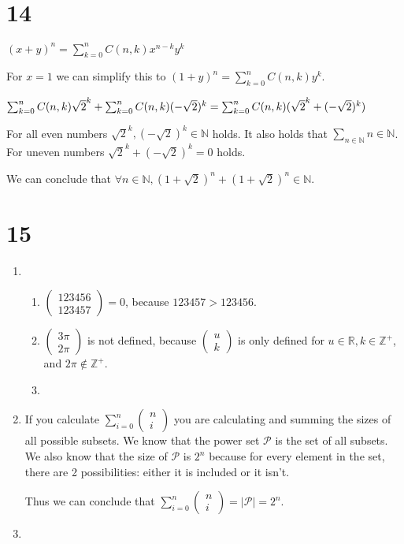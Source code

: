 \documentclass[12pt]{article}
\begin{document}
\section*{14}
$(x + y)^n = \sum_{k = 0}^{n} C(n, k) x^{n - k} y^k$

For $x = 1$ we can simplify this to $(1 + y)^n = \sum_{k = 0}^{n} C(n, k) y^k$.

$\sum_{k = 0}^{n} C(n, k) \sqrt{2}^k + \sum_{k = 0}^{n} C(n, k) (-\sqrt{2})^k\\
=\sum_{k = 0}^{n} C(n, k)(\sqrt{2}^k + (-\sqrt{2})^k)$


For all even numbers $\sqrt{2}^k, (-\sqrt{2})^k \in \mathbb{N}$ holds. It also holds that $\sum_{n \in \mathbb{N}} n \in \mathbb{N}$.\\
For uneven numbers $\sqrt{2}^k + (-\sqrt{2})^k = 0$ holds.

We can conclude that $\forall n \in \mathbb{N}, (1 + \sqrt{2})^n + (1 + \sqrt{2})^n \in \mathbb{N}$.

\section*{15}
\begin{enumerate}[a]
	\item %
	\begin{enumerate}[i]
		\item %
		$\begin{pmatrix}
			123456 \\ 123457
		\end{pmatrix} = 0$, because $123457 > 123456$.
		\item %
		$\begin{pmatrix}
			3 \pi \\ 2 \pi
		\end{pmatrix}$ is not defined, because $\begin{pmatrix}
			u \\ k
		\end{pmatrix}$ is only defined for $u \in \mathbb{R}, k \in \mathbb{Z}^+$, and $2 \pi \not \in \mathbb{Z}^+$.
		\item %
	\end{enumerate}
	\item %
	If you calculate $\sum_{i = 0}^{n} \begin{pmatrix}
		n \\ i
	\end{pmatrix}$ you are calculating and summing the sizes of all possible subsets. We know that the power set $\mathcal{P}$ is the set of all subsets. We also know that the size of $\mathcal{P}$ is $2^n$ because for every element in the set, there are 2 possibilities: either it is included or it isn't.

	Thus we can conclude that $\sum_{i = 0}^{n} \begin{pmatrix}
		n \\ i
	\end{pmatrix} = | \mathcal{P} | = 2^n$.
	\item %
\end{enumerate}
\end{document}
